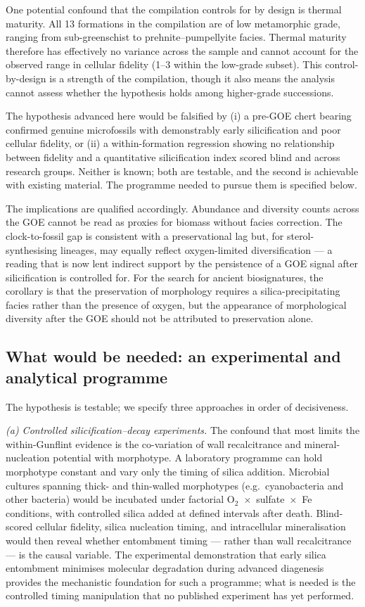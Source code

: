 \documentclass[11pt]{article}
\begin{document}
One potential confound that the compilation controls for by design is thermal maturity. All 13
formations in the compilation are of low metamorphic grade, ranging from sub-greenschist to
prehnite--pumpellyite facies. Thermal maturity therefore has effectively no variance across the
sample and cannot account for the observed range in cellular fidelity (1--3 within the low-grade
subset). This control-by-design is a strength of the compilation, though it also means the analysis
cannot assess whether the hypothesis holds among higher-grade successions.

The hypothesis advanced here would be falsified by (i) a pre-GOE chert bearing confirmed genuine
microfossils with demonstrably early silicification and poor cellular fidelity, or (ii) a
within-formation regression showing no relationship between fidelity and a quantitative
silicification index scored blind and across research groups. Neither is known; both are testable,
and the second is achievable with existing material. The programme needed to pursue them is
specified below.

The implications are qualified accordingly. Abundance and diversity counts across the GOE cannot be
read as proxies for biomass without facies correction. The clock-to-fossil gap is consistent with a
preservational lag but, for sterol-synthesising lineages, may equally reflect oxygen-limited
diversification --- a reading that is now lent indirect support by the persistence of a GOE signal
after silicification is controlled for. For the search for ancient biosignatures, the corollary is
that the preservation of morphology requires a silica-precipitating facies rather than the presence
of oxygen, but the appearance of morphological diversity after the GOE should not be attributed to
preservation alone.

\subsection{What would be needed: an experimental and analytical programme}

The hypothesis is testable; we specify three approaches in order of decisiveness.

\textit{(a) Controlled silicification--decay experiments.} The confound that most limits the
within-Gunflint evidence is the co-variation of wall recalcitrance and mineral-nucleation potential
with morphotype. A laboratory programme can hold morphotype constant and vary only the timing of
silica addition. Microbial cultures spanning thick- and thin-walled morphotypes (e.g.\ cyanobacteria
and other bacteria) would be incubated under factorial O$_2$~$\times$~sulfate~$\times$~Fe conditions,
with controlled silica added at defined intervals after death. Blind-scored cellular fidelity, silica
nucleation timing, and intracellular mineralisation would then reveal whether entombment timing ---
rather than wall recalcitrance --- is the causal variable. The experimental demonstration that early
silica entombment minimises molecular degradation during advanced diagenesis \citep{Alleon2016b}
provides the mechanistic foundation for such a programme; what is needed is the controlled timing
manipulation that no published experiment has yet performed.
\end{document}

